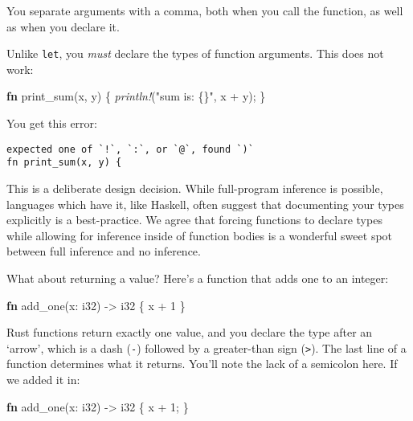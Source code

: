 \documentclass[a4paper,]{book}
\newenvironment{Shaded}{\begin{snugshade}}{\end{snugshade}}
\newcommand{\KeywordTok}[1]{\textcolor[rgb]{0.13,0.29,0.53}{\textbf{{#1}}}}
\newcommand{\DataTypeTok}[1]{\textcolor[rgb]{0.13,0.29,0.53}{{#1}}}
\newcommand{\DecValTok}[1]{\textcolor[rgb]{0.00,0.00,0.81}{{#1}}}
\newcommand{\StringTok}[1]{\textcolor[rgb]{0.31,0.60,0.02}{{#1}}}
\newcommand{\PreprocessorTok}[1]{\textcolor[rgb]{0.56,0.35,0.01}{\textit{{#1}}}}
\newcommand{\NormalTok}[1]{{#1}}
\begin{document}
You separate arguments with a comma, both when you call the function, as
well as when you declare it.

Unlike \texttt{let}, you \emph{must} declare the types of function
arguments. This does not work:

\begin{Shaded}
\begin{Highlighting}[]
\KeywordTok{fn} \NormalTok{print_sum(x, y) \{}
    \PreprocessorTok{println!}\NormalTok{(}\StringTok{"sum is: \{\}"}\NormalTok{, x + y);}
\NormalTok{\}}
\end{Highlighting}
\end{Shaded}

You get this error:

\begin{verbatim}
expected one of `!`, `:`, or `@`, found `)`
fn print_sum(x, y) {
\end{verbatim}

This is a deliberate design decision. While full-program inference is
possible, languages which have it, like Haskell, often suggest that
documenting your types explicitly is a best-practice. We agree that
forcing functions to declare types while allowing for inference inside
of function bodies is a wonderful sweet spot between full inference and
no inference.

What about returning a value? Here's a function that adds one to an
integer:

\begin{Shaded}
\begin{Highlighting}[]
\KeywordTok{fn} \NormalTok{add_one(x: }\DataTypeTok{i32}\NormalTok{) -> }\DataTypeTok{i32} \NormalTok{\{}
    \NormalTok{x + }\DecValTok{1}
\NormalTok{\}}
\end{Highlighting}
\end{Shaded}

Rust functions return exactly one value, and you declare the type after
an `arrow', which is a dash (\texttt{-}) followed by a greater-than sign
(\texttt{\textgreater{}}). The last line of a function determines what
it returns. You'll note the lack of a semicolon here. If we added it in:

\begin{Shaded}
\begin{Highlighting}[]
\KeywordTok{fn} \NormalTok{add_one(x: }\DataTypeTok{i32}\NormalTok{) -> }\DataTypeTok{i32} \NormalTok{\{}
    \NormalTok{x + }\DecValTok{1}\NormalTok{;}
\NormalTok{\}}
\end{Highlighting}
\end{Shaded}
\end{document}
